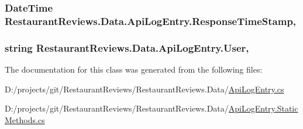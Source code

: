 \subsubsection[{\texorpdfstring{Response\+Time\+Stamp}{ResponseTimeStamp}}]{\setlength{\rightskip}{0pt plus 5cm}Date\+Time Restaurant\+Reviews.\+Data.\+Api\+Log\+Entry.\+Response\+Time\+Stamp\hspace{0.3cm}{\ttfamily [get]}, {\ttfamily [set]}}\hypertarget{class_restaurant_reviews_1_1_data_1_1_api_log_entry_a715201d4658c27737a30d9a8e3ab4024}{}\label{class_restaurant_reviews_1_1_data_1_1_api_log_entry_a715201d4658c27737a30d9a8e3ab4024}
\subsubsection[{\texorpdfstring{User}{User}}]{\setlength{\rightskip}{0pt plus 5cm}string Restaurant\+Reviews.\+Data.\+Api\+Log\+Entry.\+User\hspace{0.3cm}{\ttfamily [get]}, {\ttfamily [set]}}\hypertarget{class_restaurant_reviews_1_1_data_1_1_api_log_entry_ac4406e1d9248b32c6b93a8be18522931}{}\label{class_restaurant_reviews_1_1_data_1_1_api_log_entry_ac4406e1d9248b32c6b93a8be18522931}


The documentation for this class was generated from the following files\+:\begin{DoxyCompactItemize}
\item 
D\+:/projects/git/\+Restaurant\+Reviews/\+Restaurant\+Reviews.\+Data/\hyperlink{_api_log_entry_8cs}{Api\+Log\+Entry.\+cs}\item 
D\+:/projects/git/\+Restaurant\+Reviews/\+Restaurant\+Reviews.\+Data/\hyperlink{_api_log_entry_8_static_methods_8cs}{Api\+Log\+Entry.\+Static\+Methods.\+cs}\end{DoxyCompactItemize}
